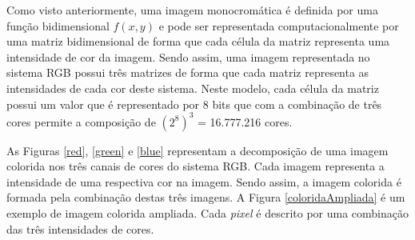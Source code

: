 Como visto anteriormente, uma imagem monocromática é definida por uma função bidimensional $f(x,y)$ e pode ser representada computacionalmente por uma matriz bidimensional de forma que cada célula da matriz representa uma intensidade de cor da imagem. Sendo assim, uma imagem representada no sistema RGB possui três matrizes de forma que cada matriz representa as intensidades de cada cor deste sistema. Neste modelo, cada célula da matriz possui um valor que é representado por 8 bits que com a combinação de três cores permite a composição de $(2^8)^3$ = 16.777.216 cores.

As Figuras \ref{red}, \ref{green} e \ref{blue} representam a decomposição de uma imagem colorida nos três canais de cores do sistema RGB. Cada imagem representa a intensidade de uma respectiva cor na imagem. Sendo assim, a imagem colorida é formada pela combinação destas três imagens. A Figura \ref{coloridaAmpliada} é um exemplo de imagem colorida ampliada. Cada \emph{pixel} é descrito por uma combinação das três intensidades de cores.

